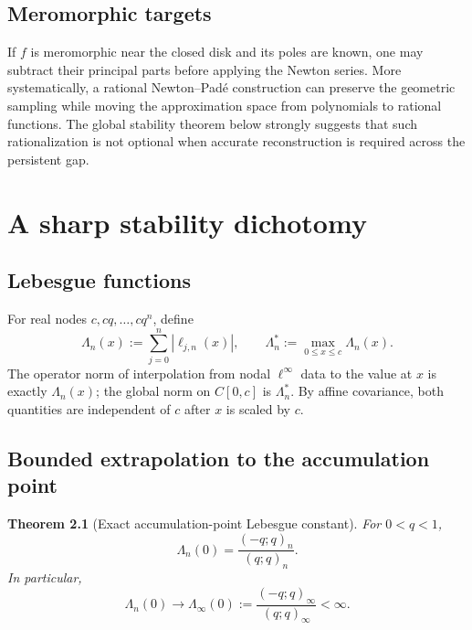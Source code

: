 \documentclass[11pt,oneside]{book}
\numberwithin{equation}{chapter}
\newtheorem{theorem}{Theorem}[chapter]
\theoremstyle{definition}
\theoremstyle{remark}
\newcommand{\Leb}{\Lambda}
\begin{document}
\section{Meromorphic targets}

If $f$ is meromorphic near the closed disk and its poles are known, one may
subtract their principal parts before applying the Newton series.  More
systematically, a rational Newton--Pad\'e construction can preserve the
geometric sampling while moving the approximation space from polynomials to
rational functions.  The global stability theorem below strongly suggests
that such rationalization is not optional when accurate reconstruction is
required across the persistent gap.

\chapter{A sharp stability dichotomy}
\label{chap:stability}

\section{Lebesgue functions}

For real nodes $c,cq,\ldots,cq^n$, define
\begin{equation}
 \Leb_n(x):=\sum_{j=0}^n|\ell_{j,n}(x)|,
 \qquad
 \Leb_n^*:=\max_{0\le x\le c}\Leb_n(x).
 \label{eq:lebesgue-definition}
\end{equation}
The operator norm of interpolation from nodal $\ell^\infty$ data to the
value at $x$ is exactly $\Leb_n(x)$; the global norm on $C[0,c]$ is
$\Leb_n^*$.  By affine covariance, both quantities are independent of $c$
after $x$ is scaled by $c$.

\section{Bounded extrapolation to the accumulation point}

\begin{theorem}[Exact accumulation-point Lebesgue constant]
\label{thm:endpoint-lebesgue}
For $0<q<1$,
\begin{equation}
 \boxed{
 \Leb_n(0)=\frac{(-q;q)_n}{(q;q)_n}.}
 \label{eq:endpoint-lebesgue}
\end{equation}
In particular,
\begin{equation}
 \Leb_n(0)\longrightarrow
 \Leb_\infty(0):=\frac{(-q;q)_\infty}{(q;q)_\infty}<\infty.
 \label{eq:endpoint-lebesgue-limit}
\end{equation}
\end{theorem}
\end{document}
